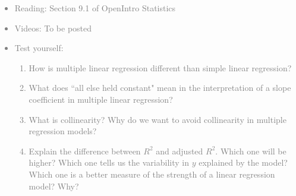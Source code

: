 \documentclass[11pt]{article}
\newcommand{\gray}[1]{\textcolor{gray}{#1}}
\begin{document}
\gray{
{\it
\vspace{-0.55cm}
\begin{itemize}
\renewcommand{\labelitemi}{{\textcolor{dark}{$\ast$}}}
\item Reading: Section 9.1 of OpenIntro Statistics
\item Videos: To be posted
\item Test yourself:
\begin{enumerate}
\item How is multiple linear regression different than simple linear regression?
\item What does ``all else held constant" mean in the interpretation of a slope coefficient in multiple linear regression?
\item What is collinearity? Why do we want to avoid collinearity in multiple regression models?
\item Explain the difference between $R^2$ and adjusted $R^2$. Which one will be higher? Which one tells us the variability in $y$ explained by the model? Which one is a better measure of the strength of a linear regression model? Why?
\end{enumerate}
\end{itemize}
}}

%

\vspace{0.48cm}
\end{document}
